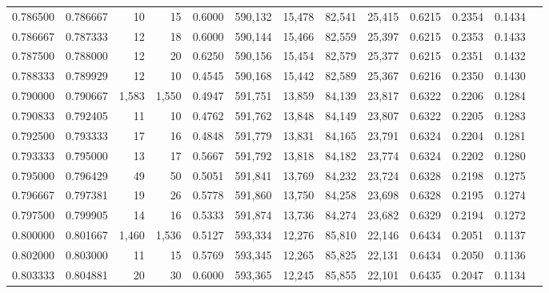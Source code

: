 \begin{tabular}{rrrrrrrrrrrrr}
0.786500 & 0.786667 &     10 &    15 &                                     0.6000 & 590,132 &  15,478 &  82,541 &  25,415 & 0.6215 & 0.2354 & 0.1434 \\
0.786667 & 0.787333 &     12 &    18 &                                     0.6000 & 590,144 &  15,466 &  82,559 &  25,397 & 0.6215 & 0.2353 & 0.1433 \\
0.787500 & 0.788000 &     12 &    20 &                                     0.6250 & 590,156 &  15,454 &  82,579 &  25,377 & 0.6215 & 0.2351 & 0.1432 \\
0.788333 & 0.789929 &     12 &    10 &                                     0.4545 & 590,168 &  15,442 &  82,589 &  25,367 & 0.6216 & 0.2350 & 0.1430 \\
0.790000 & 0.790667 &  1,583 & 1,550 &                                     0.4947 & 591,751 &  13,859 &  84,139 &  23,817 & 0.6322 & 0.2206 & 0.1284 \\
0.790833 & 0.792405 &     11 &    10 &                                     0.4762 & 591,762 &  13,848 &  84,149 &  23,807 & 0.6322 & 0.2205 & 0.1283 \\
0.792500 & 0.793333 &     17 &    16 &                                     0.4848 & 591,779 &  13,831 &  84,165 &  23,791 & 0.6324 & 0.2204 & 0.1281 \\
0.793333 & 0.795000 &     13 &    17 &                                     0.5667 & 591,792 &  13,818 &  84,182 &  23,774 & 0.6324 & 0.2202 & 0.1280 \\
0.795000 & 0.796429 &     49 &    50 &                                     0.5051 & 591,841 &  13,769 &  84,232 &  23,724 & 0.6328 & 0.2198 & 0.1275 \\
0.796667 & 0.797381 &     19 &    26 &                                     0.5778 & 591,860 &  13,750 &  84,258 &  23,698 & 0.6328 & 0.2195 & 0.1274 \\
0.797500 & 0.799905 &     14 &    16 &                                     0.5333 & 591,874 &  13,736 &  84,274 &  23,682 & 0.6329 & 0.2194 & 0.1272 \\
0.800000 & 0.801667 &  1,460 & 1,536 &                                     0.5127 & 593,334 &  12,276 &  85,810 &  22,146 & 0.6434 & 0.2051 & 0.1137 \\
0.802000 & 0.803000 &     11 &    15 &                                     0.5769 & 593,345 &  12,265 &  85,825 &  22,131 & 0.6434 & 0.2050 & 0.1136 \\
0.803333 & 0.804881 &     20 &    30 &                                     0.6000 & 593,365 &  12,245 &  85,855 &  22,101 & 0.6435 & 0.2047 & 0.1134 \\

\end{tabular}
